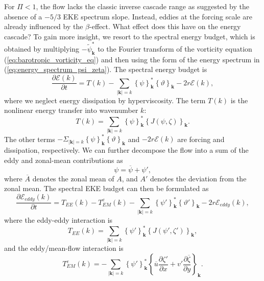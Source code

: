 \documentclass{jfm}
\begin{document}
For $\Pi<1$, the flow lacks the classic inverse cascade range as 
suggested by the absence of a $-5/3$ EKE spectrum slope. Instead, eddies at 
the forcing scale are already influenced by the $\beta$-effect. What effect 
does this have on the energy cascade? To gain more insight, 
we resort to the spectral energy budget, 
which is obtained by multiplying $-\widetilde{\psi}_{\mathbf{k}}^{*}$
to the Fourier transform of the vorticity equation (\ref{eq:barotropic_vorticity_eq})
and then using the form of the energy spectrum in (\ref{eq:energy_spectrum_psi_zeta}).
The spectral energy budget is
\begin{equation}
\frac{\partial\mathcal{E}(k)}{\partial t}=T(k)-\underset{|\mathbf{k}|=k}{\sum}\left\{ \psi\right\} _{\mathbf{k}}^{*}\left\{ \vartheta\right\} _{\mathbf{k}}-2r\mathcal{E}(k),\label{eq:spectral_energy_budget}
\end{equation}
where we neglect energy dissipation by hyperviscosity. The term $T(k)$
is the nonlinear energy transfer into wavenumber $k$:
\begin{equation}
T(k)=\underset{|\mathbf{k}|=k}{\sum}\left\{ \psi\right\} _{\mathbf{k}}^{*}\left\{ J(\psi,\zeta)\right\} _{\mathbf{k}}.
\end{equation}
The other terms $-\Sigma_{|\mathbf{k}|=k}\left\{ \psi\right\} _{\mathbf{k}}^{*}\left\{ \vartheta\right\} _{\mathbf{k}}$
and $-2r\mathcal{E}(k)$ are forcing and dissipation, respectively.
We can further decompose the flow into a sum of the eddy and zonal-mean contributions as
\begin{equation}
\psi=\overline{\psi}+\psi',
\end{equation}
where $\overline{A}$ denotes the zonal mean of $A$, and 
$A'$ denotes the deviation from the zonal mean. The spectral EKE
budget can then be formulated as
\begin{equation}
\frac{\partial\mathcal{E}_{eddy}(k)}{\partial t}=T_{EE}(k)-T_{EM}^{e}(k)-\underset{|\mathbf{k}|=k}{\sum}\left\{ \psi'\right\} _{\mathbf{k}}^{*}\left\{ \vartheta'\right\} _{\mathbf{k}}-2r\mathcal{E}_{eddy}(k),\label{eq:spectral_EKE_budget}
\end{equation}
where the eddy-eddy interaction is 
\begin{equation}
T_{EE}(k)=\underset{|\mathbf{k}|=k}{\sum}\left\{ \psi'\right\} _{\mathbf{k}}^{*}\left\{ J(\psi',\zeta')\right\} _{\mathbf{k}},
\end{equation}
and the eddy/mean-flow interaction is
\begin{equation}
T_{EM}^{e}(k)=-\underset{|\mathbf{k}|=k}{\sum}\left\{ \psi'\right\} _{\mathbf{k}}^{*}\left\{ \overline{u}\frac{\partial\zeta'}{\partial x}+v'\frac{\partial\overline{\zeta}}{\partial y}\right\} _{\mathbf{k}}.
\end{equation}
\end{document}
